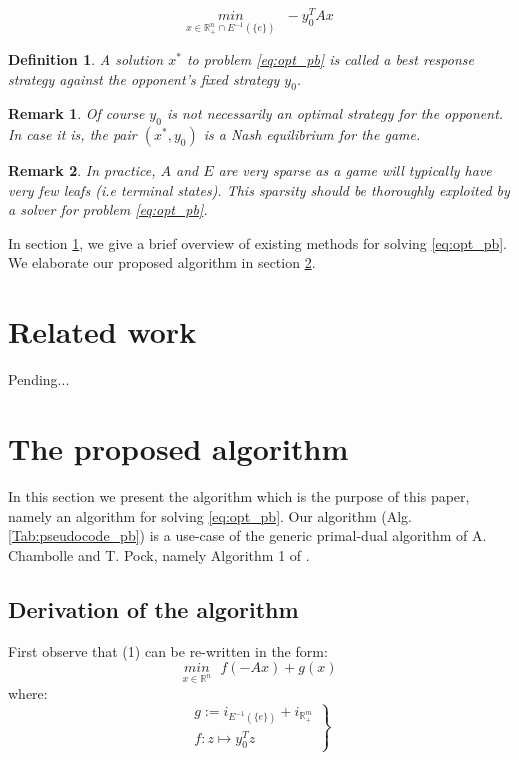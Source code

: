 \documentclass[a4paper,10pt,journal]{IEEEtran}
\newtheorem{remark}{Remark}
\newtheorem{definition}[theorem]{Definition}
\begin{document}
\begin{equation}
  \underset{x \in \mathbb{R}_{+}^n \cap E^{-1}(\{e\})}{min}\text{ }-y_0^TAx
  \label{eq:opt_pb}
\end{equation}

\begin{definition}
A solution $x^*$ to problem \eqref{eq:opt_pb} is called a \textit{best response} strategy against the opponent's fixed strategy $y_0$.
\end{definition}

\begin{remark}
Of course $y_0$ is not necessarily an optimal strategy for the opponent. In case it is, the pair $(x^*, y_0)$ is a Nash equilibrium for the game.
\end{remark}

\begin{remark}
  In practice, $A$ and $E$ are very sparse as a game will typically have very few leafs
(i.e terminal states). This sparsity should be thoroughly exploited by a solver for problem \eqref{eq:opt_pb}.
\end{remark}

In section \ref{sec:related_work}, we give a brief overview of existing methods for solving \eqref{eq:opt_pb}.
We elaborate our proposed algorithm in section \ref{sec:algo}.

\section{Related work}
\label{sec:related_work}

Pending...

\section{The proposed algorithm}
\label{sec:algo}
In this section we present the algorithm which is the purpose of this paper, namely an algorithm
for solving \eqref{eq:opt_pb}. Our algorithm (Alg.\ref{Tab:pseudocode_pb}) is a use-case of
the generic primal-dual algorithm of A. Chambolle and T. Pock, namely Algorithm 1 of \cite{chambolle2010}.

\subsection{Derivation of the algorithm}
First observe that (1) can be re-written in the form:
\begin{equation}
  \underset{x \in \mathbb{R}^n}{min}\text{ }{f(-Ax) + g(x)}
\end{equation}
where:\\
\begin{equation}
  \left.
  \begin{aligned}
    g := i_{E^{-1}(\{e\})} + i_{\mathbb{R}_{+}^m}\\
    f: z \mapsto y_0^Tz
    \end{aligned}
  \right\}
\end{equation}
\end{document}
